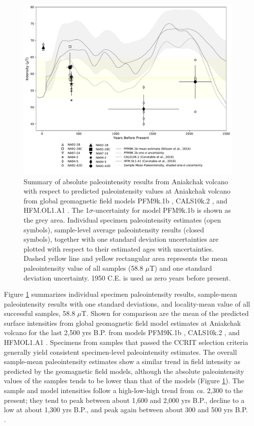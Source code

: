 \documentclass[draft]{agujournal2019}
\begin{document}
\begin{figure}
\centering
\noindent\includegraphics[width=30pc]{../Figure/VADM_comparison_revision_092321.pdf}
\caption{Summary of absolute paleointensity results from Aniakchak volcano with respect to predicted paleointensity values at Aniakchak volcano from global geomagnetic field models PFM9k.1b \cite{Nilsson2014a}, CALS10k.2 \cite{Constable2016a}, and HFM.OL1.A1 \cite{Constable2016a}. The 1$\sigma$-uncertainty for model PFM9k.1b is shown as the grey area. Individual specimen paleointensity estimates (open symbols), sample-level average paleointensity results (closed symbols), together with one standard deviation uncertainties are plotted with respect to their estimated ages with uncertainties. Dashed yellow line and yellow rectangular area represents the mean paleointensity value of all samples (58.8 $\mu$T) and one standard deviation uncertainty. 1950 C.E. is used as zero years before present.}
\label{VADM_comparisons}
\end{figure}

Figure \ref{VADM_comparisons} summarizes individual specimen paleointensity results, sample-mean paleointensity results with one standard deviations, and locality-mean value of all successful samples, 58.8 $\mu$T. Shown for comparison are the mean of the %
predicted surface intensities from global geomagnetic field model estimates at Aniakchak volcano for the last 2,500 yrs B.P. from models PFM9K.1b \cite{Nilsson2014a}, CALS10k.2 \cite{Constable2016a}, and HFMOL1.A1 \cite{Constable2016a}. Specimens from samples that passed the CCRIT selection criteria generally yield consistent specimen-level paleointensity estimates. The overall sample-mean paleointensity estimates show a similar trend in field intensity as predicted by the geomagnetic field models, although the absolute paleointensity values of the samples tends to be lower than that of the models (Figure \ref{VADM_comparisons}). The sample and model intensities follow a high-low-high trend from \textit{ca.} 2,300 to the present; they tend to peak between about 1,600 and 2,000 yrs B.P., decline to a low at about 1,300 yrs B.P., and peak again between about 300 and 500 yrs B.P.  . 
\end{document}
